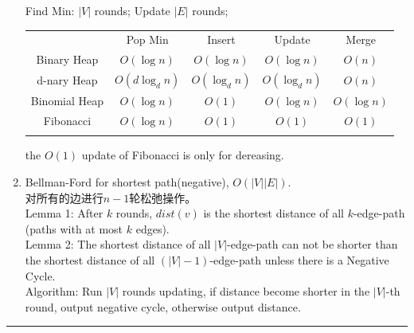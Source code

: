\documentclass[10pt, a4paper, twocolumn]{article}
\begin{document}
\begin{enumerate}[leftmargin = 12pt, topsep = 0pt, itemsep=0pt, partopsep = 0pt]
\begin{itemize}[leftmargin = 12pt, topsep = 0pt, itemsep=0pt, partopsep = 0pt]
        \end{itemize}
        Find Min: $|V|$ rounds; Update $|E|$ rounds;\\
        \begin{table}[htbp]
    	\centering
    	\begin{tabular}{ccccc}
    		\hline\hline\noalign{\smallskip}	
    		 & Pop Min & Insert & Update & Merge  \\
    		\noalign{\smallskip}\hline\noalign{\smallskip}
    		Binary Heap & $O(\log n)$ & $O(\log n)$ & $O(\log n)$ & $O(n)$ \\
    		d-nary Heap & $O(d\log_d n)$ & $O(\log_d n)$ & $O(\log_d n)$ & $O(n)$ \\
    		Binomial Heap & $O(\log n)$ & $O(1)$ & $O(\log n)$ & $O(\log n)$ \\
    		Fibonacci & $O(\log n)$ & $O(1)$ & $O(1)$ & $O(1)$\\
    		\noalign{\smallskip}\hline
    	\end{tabular}
        \end{table}
        the $O(1)$ update of Fibonacci is only for dereasing. 
    \item Bellman-Ford for shortest path(negative), $O(|V||E|)$.\\
    对所有的边进行$n-1$轮松弛操作。\\
    Lemma 1: After $k$ rounds, $dist(v)$ is the shortest distance of all $k$-edge-path (paths with at most $k$ edges).\\
    Lemma 2: The shortest distance of all $|V|$-edge-path can not be shorter than the shortest distance of all $(|V|-1)$-edge-path unless there is a Negative Cycle.\\
    Algorithm: Run $|V|$ rounds updating, if distance become shorter in the $|V|$-th round, output negative cycle, otherwise output distance.
\end{enumerate}
\vspace{0.1cm}
\hrule
\end{document}
